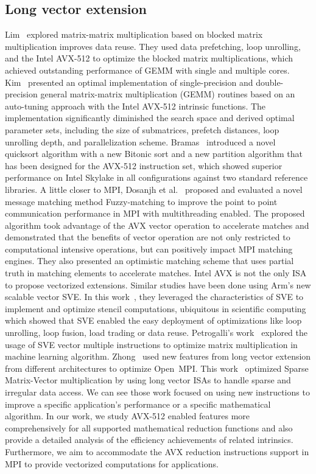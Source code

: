 \documentclass[5p,times,twocolumn]{elsarticle}
\newcommand{\ompi}[0]{Open~MPI\xspace}
\newcommand{\sve}[0]{\textsc{SVE}\xspace}
\begin{document}
\subsection{Long vector extension}
Lim~\cite{Lim2018} explored matrix-matrix multiplication based on blocked matrix multiplication
improves data reuse. They used data prefetching, loop unrolling, and the Intel AVX-512
to optimize the blocked matrix multiplications, which achieved outstanding performance of GEMM
with single and multiple cores.
%
Kim~\cite{Kim19} presented an optimal implementation of single-precision and double-precision general matrix-matrix multiplication (GEMM) routines based on an auto-tuning approach with the Intel AVX-512 intrinsic functions.
The implementation significantly diminished the search space and derived optimal parameter sets, including the size of submatrices, prefetch distances, loop unrolling depth, and parallelization scheme.
%
Bramas~\cite{Bramas2017} introduced a novel quicksort algorithm with a new Bitonic sort and a new
partition algorithm that has been designed for the AVX-512
instruction set, which showed superior performance on Intel Skylake in
all configurations against two standard reference libraries.
%
A little closer to MPI, Dosanjh et al.~\cite{tag-match} proposed and evaluated a novel message matching method Fuzzy-matching
to improve the point to point communication performance in MPI with multithreading enabled.
The proposed algorithm took advantage of the AVX vector operation to accelerate matches
and demonstrated that the benefits of vector operation are not only restricted to computational intensive operations, but can positively impact MPI matching engines. They also presented an optimistic
matching scheme that uses partial truth in matching elements
to accelerate matches.
%
Intel AVX is not the only ISA to propose vectorized extensions. Similar studies have been done using Arm's new scalable vector SVE.
In this work~\cite{sve-stencil}, they leveraged the characteristics of \sve to implement and optimize
stencil computations, ubiquitous in scientific computing which showed
that \sve enabled the easy deployment of optimizations like loop unrolling,
loop fusion, load trading or data reuse.
%
Petrogalli's work~\cite{sveml} explored the usage of SVE vector multiple
instructions to optimize matrix multiplication in machine learning algorithm.
%
Zhong~\cite{dongsve, avxeurpmpi2020} used new features from long vector extension from different architectures
to optimize \ompi.
%
This work~\cite{longvectarch} optimized Sparse Matrix-Vector multiplication by using long vector ISAs
to handle sparse and irregular data access.
%
We can see those work focused on using new instructions to improve a specific application's performance or a specific mathematical algorithm.
In our work, we study AVX-512 enabled features more comprehensively for
all supported mathematical reduction functions and also provide
a detailed analysis of the efficiency achievements of related intrinsics.
Furthermore, we aim to accommodate the AVX reduction instructions support in MPI to provide
vectorized computations for applications.
\end{document}
